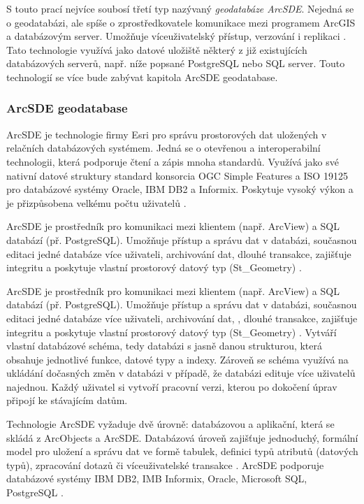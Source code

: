         S touto prací nejvíce soubosí třetí typ nazývaný {\it geodatabáze ArcSDE}. Nejedná se o geodatabázi, ale spíše o zprostředkovatele komunikace mezi programem ArcGIS a databázovým server. Umožňuje víceuživatelský přístup, verzování i replikaci \citep{Esri2006}. Tato technologie využívá jako datové uložiště některý z již existujících databázových serverů, např. níže popsané PostgreSQL nebo SQL server. Touto technologií se více bude zabývat kapitola  ArcSDE geodatabase.

        \subsubsection{ArcSDE geodatabase}
        \label{kArcSDE}
        ArcSDE je technologie firmy Esri pro správu prostorových dat uložených v relačních databázových systémem. Jedná se o otevřenou a interoperabilní technologii, která podporuje čtení a zápis mnoha standardů. Využívá jako své nativní datové struktury standard konsorcia OGC Simple Features a ISO 19125 pro databázové systémy Oracle, IBM DB2 a Informix. Poskytuje vysoký výkon a je přizpůsobena velkému počtu uživatelů \citep{Esri2006}.

ArcSDE je prostředník pro komunikaci mezi klientem (např. ArcView) a SQL databází (př. PostgreSQL). Umožňuje přístup a správu dat v databázi, současnou editaci jedné databáze více uživateli, archivování  dat, dlouhé transakce, zajišťuje integritu a poskytuje vlastní prostorový datový typ (St\_Geometry) \citep{Law2008}. 

ArcSDE je prostředník pro komunikaci mezi klientem (např. ArcView) a SQL databází (př. PostgreSQL). Umožňuje přístup a správu dat v databázi, současnou editaci jedné databáze více uživateli, archivování  dat, , dlouhé transakce, zajišťuje integritu a poskytuje vlastní prostorový datový typ (St\_Geometry) \citep{Law2008}. 
Vytváří vlastní databázové schéma, tedy databázi s jasně danou strukturou, která obsahuje jednotlivé funkce, datové typy a indexy. Zároveň se schéma využívá na ukládání dočasných změn v databázi v případě, že databázi edituje více uživatelů najednou. Každý uživatel si vytvoří pracovní verzi, kterou po dokočení úprav připojí ke stávajícím datům.

Technologie ArcSDE vyžaduje dvě úrovně: databázovou a aplikační, která se skládá z ArcObjects a ArcSDE. Databázová úroveň zajišťuje jednoduchý, formální model pro uložení a správu dat ve formě tabulek, definici typů atributů (datových typů), zpracování dotazů či víceuživatelské transakce \citep{Law2008}. ArcSDE podporuje databázové systémy IBM DB2, IMB Informix, Oracle, Microsoft SQL, PostgreSQL \citep{Esri2013a}.

